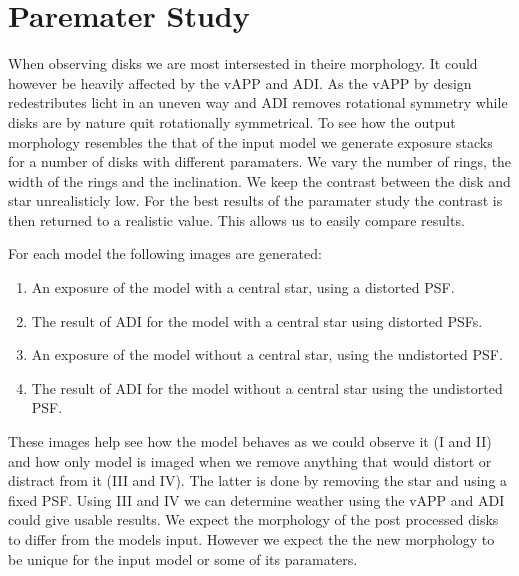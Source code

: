 \section{Paremater Study}

When observing disks we are most intersested in theire morphology. It could however be heavily affected by the \ac{vAPP} and \ac{ADI}. As the \ac{vAPP} by design redestributes licht in an uneven way and \ac{ADI} removes rotational symmetry while disks are by nature quit rotationally symmetrical. To see how the output morphology resembles the that of the input model we generate exposure stacks for a number of disks with different paramaters. We vary the number of rings, the width of the rings and the inclination. We keep the contrast between the disk and star unrealisticly low. For the best results of the paramater study the contrast is then returned to a realistic value. This allows us to easily compare results.

For each model the following images are generated:

\begin{enumerate}[I]
\item An exposure of the model with a central star, using a distorted \ac{PSF}.
\item The result of \ac{ADI} for the model with a central star using distorted \acp{PSF}.

\item An exposure of the model without a central star, using the undistorted \ac{PSF}.
\item The result of \ac{ADI} for the model without a central star using the undistorted \ac{PSF}. %
\end{enumerate}

These images help see how the model behaves as we could observe it (I and II) and how only model is imaged when we remove anything that would distort or distract from it (III and IV). The latter is done by removing the star and using a fixed \ac{PSF}. Using III and IV we can determine weather using the \ac{vAPP} and \ac{ADI} could give usable results.
We expect the morphology of the post processed disks to differ from the models input. However we expect the the new morphology to be unique for the input model or some of its paramaters.


